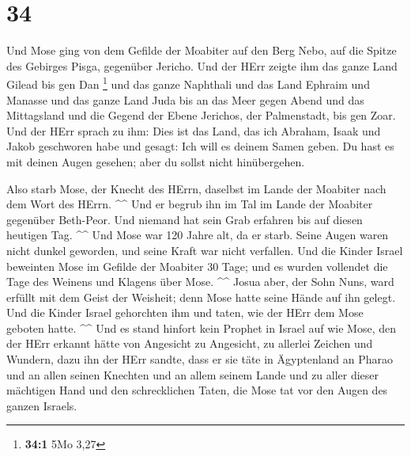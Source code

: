 \hypertarget{section-11}{%
\section{34}\label{section-11}}

 Und Mose ging von dem Gefilde der Moabiter auf den Berg
Nebo, auf die Spitze des Gebirges Pisga, gegenüber Jericho. Und der HErr
zeigte ihm das ganze Land Gilead bis gen Dan \footnote{\textbf{34:1} 5Mo
  3,27}  und das ganze Naphthali und das Land Ephraim und
Manasse und das ganze Land Juda bis an das Meer gegen Abend 
und das Mittagsland und die Gegend der Ebene Jerichos, der Palmenstadt,
bis gen Zoar.  Und der HErr sprach zu ihm: Dies ist das
Land, das ich Abraham, Isaak und Jakob geschworen habe und gesagt: Ich
will es deinem Samen geben. Du hast es mit deinen Augen gesehen; aber du
sollst nicht hinübergehen.

 Also starb Mose, der Knecht des HErrn, daselbst im Lande
der Moabiter nach dem Wort des HErrn. \^{}\^{}  Und er
begrub ihn im Tal im Lande der Moabiter gegenüber Beth-Peor. Und niemand
hat sein Grab erfahren bis auf diesen heutigen Tag. \^{}\^{}
 Und Mose war 120 Jahre alt, da er starb. Seine Augen waren
nicht dunkel geworden, und seine Kraft war nicht verfallen. 
Und die Kinder Israel beweinten Mose im Gefilde der Moabiter 30 Tage;
und es wurden vollendet die Tage des Weinens und Klagens über Mose.
\^{}\^{}  Josua aber, der Sohn Nuns, ward erfüllt mit dem
Geist der Weisheit; denn Mose hatte seine Hände auf ihn gelegt. Und die
Kinder Israel gehorchten ihm und taten, wie der HErr dem Mose geboten
hatte. \^{}\^{}  Und es stand hinfort kein Prophet in
Israel auf wie Mose, den der HErr erkannt hätte von Angesicht zu
Angesicht,  zu allerlei Zeichen und Wundern, dazu ihn der
HErr sandte, dass er sie täte in Ägyptenland an Pharao und an allen
seinen Knechten und an allem seinem Lande  und zu aller
dieser mächtigen Hand und den schrecklichen Taten, die Mose tat vor den
Augen des ganzen Israels.
